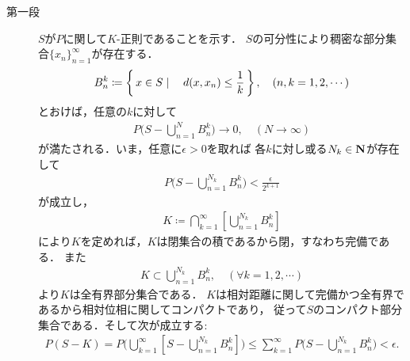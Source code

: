 	\begin{prf}\mbox{}
		\begin{description}
			\item[第一段]
				$S$が$P$に関して$K$-正則であることを示す．
				$S$の可分性により稠密な部分集合$\{x_n\}_{n=1}^\infty$が存在する．
				\begin{align}
					B_n^k \coloneqq \left\{\, x \in S \mid \quad d(x,x_n) \leq \frac{1}{k}\, \right\},
					\quad (n,k=1,2,\cdots)
				\end{align}
				とおけば，任意の$k$に対して
				\begin{align}
					P\Biggl( S - \bigcup_{n=1}^N B_n^k \Biggr)
					\longrightarrow 0,
					\quad (N \longrightarrow \infty)
				\end{align}
				が満たされる．いま，任意に$\epsilon > 0$を取れば
				各$k$に対し或る$N_k \in \mathbf{N}$が存在して
				\begin{align}
					P\Biggl( S - \bigcup_{n=1}^{N_k} B_n^k \Biggr)
					< \frac{\epsilon}{2^{k+1}}
				\end{align}
				が成立し，
				\begin{align}
					K \coloneqq \bigcap_{k=1}^\infty \left[ \bigcup_{n=1}^{N_k} B_n^k \right]
				\end{align}
				により$K$を定めれば，$K$は閉集合の積であるから閉，すなわち完備である．
				また
				\begin{align}
					K \subset \bigcup_{n=1}^{N_k} B_n^k,
					\quad (\forall k=1,2,\cdots)
				\end{align}
				より$K$は全有界部分集合である．
				$K$は相対距離に関して完備かつ全有界であるから相対位相に関してコンパクトであり，
				従って$S$のコンパクト部分集合である．そして次が成立する:
				\begin{align}
					P(S - K)
					= P\Biggl( \bigcup_{k=1}^\infty \left[S - \bigcup_{n=1}^{N_k} B_n^k \right] \Biggr)
					\leq \sum_{k=1}^\infty P\Biggl(S - \bigcup_{n=1}^{N_k} B_n^k\Biggr)
					< \epsilon.
				\end{align}
				

\end{description}
\end{prf}
